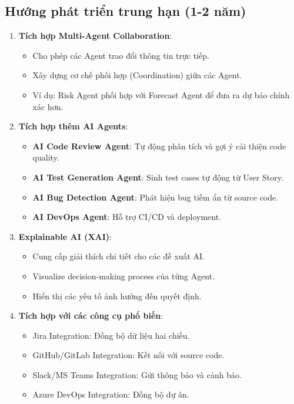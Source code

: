 \documentclass[12pt,a4paper]{report}
\begin{document}
\subsection{Hướng phát triển trung hạn (1-2 năm)}

\begin{enumerate}
\item \textbf{Tích hợp Multi-Agent Collaboration}:
\begin{itemize}
\item Cho phép các Agent trao đổi thông tin trực tiếp.
\item Xây dựng cơ chế phối hợp (Coordination) giữa các Agent.
\item Ví dụ: Risk Agent phối hợp với Forecast Agent để đưa ra dự báo chính xác hơn.
\end{itemize}

\item \textbf{Tích hợp thêm AI Agents}:
\begin{itemize}
\item \textbf{AI Code Review Agent}: Tự động phân tích và gợi ý cải thiện code quality.
\item \textbf{AI Test Generation Agent}: Sinh test cases tự động từ User Story.
\item \textbf{AI Bug Detection Agent}: Phát hiện bug tiềm ẩn từ source code.
\item \textbf{AI DevOps Agent}: Hỗ trợ CI/CD và deployment.
\end{itemize}

\item \textbf{Explainable AI (XAI)}:
\begin{itemize}
\item Cung cấp giải thích chi tiết cho các đề xuất AI.
\item Visualize decision-making process của từng Agent.
\item Hiển thị các yếu tố ảnh hưởng đến quyết định.
\end{itemize}

\item \textbf{Tích hợp với các công cụ phổ biến}:
\begin{itemize}
\item Jira Integration: Đồng bộ dữ liệu hai chiều.
\item GitHub/GitLab Integration: Kết nối với source code.
\item Slack/MS Teams Integration: Gửi thông báo và cảnh báo.
\item Azure DevOps Integration: Đồng bộ dự án.
\end{itemize}
\end{enumerate}
\end{document}
